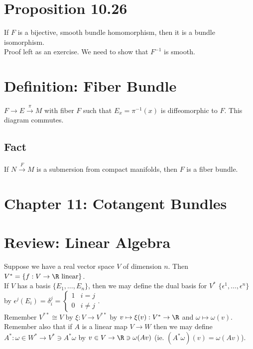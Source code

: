 \documentclass[11pt]{article}
\begin{document}
\section*{Proposition 10.26}
\label{sec:org7cbcf3c}


If \(F\) is a bijective, smooth bundle homomorphism, then it is a bundle isomorphism.\\
Proof left as an exercise. We need to show that \(F^{-1}\) is smooth.\\
\section*{Definition: Fiber Bundle}
\label{sec:org5e638af}
\(F\to E\overset{\pi}{\to} M\) with fiber \(F\) such that \(E_{x}=\pi^{-1}(x)\) is diffeomorphic to \(F\). This diagram commutes.\\

\subsection*{Fact}
\label{sec:org5b76d26}
If \(N\overset{F}{\to}M\) is a submersion from compact manifolds, then \(F\) is a fiber bundle.\\
\section*{Chapter 11: Cotangent Bundles}
\label{sec:org2a7c59d}
\section*{Review: Linear Algebra}
\label{sec:orgdfcb99c}
Suppose we have a real vector space \(V\) of dimension \(n\). Then \(V^{*}=\{f:V\to\R\text{ linear}\}\).\\
If \(V\) has a basis \(\{E_{1},\ldots,E_{n}\}\), then we may define the dual basis for \(V^{*}\) \(\{\epsilon^{1},\ldots,\epsilon^{n}\}\) by \(\epsilon^{j}(E_{i})=\delta_{i}^{j}=\begin{cases}1 & i=j \\ 0 & i\neq j\end{cases}\).\\
Remember \(V^{**}\cong V\) by \(\xi:V\to V^{**}\) by \(v\mapsto\xi(v):V^{*}\to\R\) and \(\omega\mapsto \omega(v)\).\\
Remember also that if \(A\) is a linear map \(V\to W\) then we may define \(A^{*}:\omega\in W^{*}\to V^{*}\ni A^{*}\omega\) by \(v\in V\to\R\ni\omega(Av)\) (ie. \((A^{*}\omega)(v)=\omega(Av)\)).\\
\end{document}
